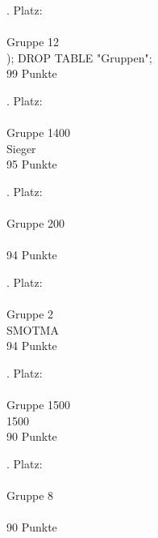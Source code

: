 \documentclass{beamer}
\begin{document}
\begin{frame}
\huge
{}. Platz:
\\
\ \\
Gruppe 12
\\
); DROP TABLE "Gruppen";
\\
99 Punkte
\end{frame}

\begin{frame}
\huge
{}. Platz:
\\
\ \\
Gruppe 1400
\\
Sieger
\\
95 Punkte
\end{frame}

\begin{frame}
\huge
{}. Platz:
\\
\ \\
Gruppe 200
\\
\
\\
94 Punkte
\end{frame}

\begin{frame}
\huge
{}. Platz:
\\
\ \\
Gruppe 2
\\
SMOTMA
\\
94 Punkte
\end{frame}

\begin{frame}
\huge
{}. Platz:
\\
\ \\
Gruppe 1500
\\
1500
\\
90 Punkte
\end{frame}

\begin{frame}
\huge
{}. Platz:
\\
\ \\
Gruppe 8
\\
\
\\
90 Punkte
\end{frame}

\end{document}
